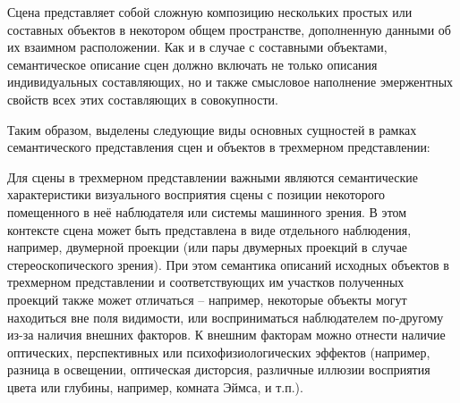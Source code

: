 Сцена представляет собой сложную композицию нескольких простых или составных объектов в некотором общем пространстве, дополненную данными об их взаимном расположении. Как и в случае с составными объектами, семантическое описание сцен должно включать не только описания индивидуальных составляющих, но и также смысловое наполнение эмержентных свойств всех этих составляющих в совокупности.

Таким образом, выделены следующие виды основных сущностей в рамках семантического представления сцен и объектов в трехмерном представлении:

\begin{SCn}
\end{SCn}
\begin{SCn}
\end{SCn}
\begin{SCn}
\end{SCn}
\begin{SCn}
\end{SCn}

Для сцены в трехмерном представлении важными являются семантические характеристики визуального восприятия сцены с позиции некоторого помещенного в неё наблюдателя или системы машинного зрения. В этом контексте сцена может быть представлена в виде отдельного наблюдения, например, двумерной проекции (или пары двумерных проекций в случае стереоскопического зрения). При этом семантика описаний исходных объектов в трехмерном представлении и соответствующих им участков полученных проекций также может отличаться -- например, некоторые объекты могут находиться вне поля видимости, или восприниматься наблюдателем по-другому из-за наличия внешних факторов. К внешним факторам можно отнести наличие оптических, перспективных или психофизиологических эффектов (например, разница в освещении, оптическая дисторсия, различные иллюзии восприятия цвета или глубины, например, комната Эймса, и т.п.). 

